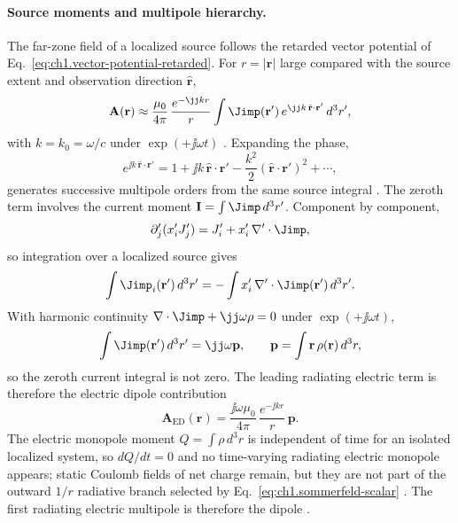 \paragraph{Source moments and multipole hierarchy.}
\label{sec:ch01.6.4}

The far-zone field of a localized source follows the retarded vector potential of Eq.~\eqref{eq:ch1.vector-potential-retarded}. For $r=|\mathbf{r}|$ large compared with the source extent and observation direction $\hat{\mathbf{r}}$,
\begin{equation}
\label{eq:ch1.far-zone-vector-potential}
\mathbf{A}(\mathbf{r})
\approx
\frac{\mu_0}{4\pi}\,
\frac{e^{-\jj kr}}{r}
\int \Jimp(\mathbf{r}')\,
e^{\jj k\,\hat{\mathbf{r}}\cdot\mathbf{r}'}\,
d^3r',
\end{equation}
with $k=k_0=\omega/c$ under $\exp(+\jj\omega t)$ \cite{jackson1999,stratton1941}. Expanding the phase,
\begin{equation}
\label{eq:ch1.source-phase-expansion}
e^{\jj k\,\hat{\mathbf{r}}\cdot\mathbf{r}'}
=
1+\jj k\,\hat{\mathbf{r}}\cdot\mathbf{r}'
-\frac{k^2}{2}(\hat{\mathbf{r}}\cdot\mathbf{r}')^{2}+\cdots,
\end{equation}
generates successive multipole orders from the same source integral \cite{stratton1941,jackson1999}. The zeroth term involves the current moment $\mathbf{I}=\int\Jimp\,d^3r'$. Component by component,
\begin{equation}
\label{eq:ch1.current-moment-identity}
\partial_j'(x_i' J_j')
=J_i'+x_i'\,\nabla'\cdot\Jimp,
\end{equation}
so integration over a localized source gives
\begin{equation}
\label{eq:ch1.total-current-moment}
\int\Jimp_i(\mathbf{r}')\,d^3r'
=-\int x_i'\,\nabla'\cdot\Jimp(\mathbf{r}')\,d^3r'.
\end{equation}
With harmonic continuity $\nabla\cdot\Jimp+\jj\omega\rho=0$ under $\exp(+\jj\omega t)$,
\begin{equation}
\label{eq:ch1.current-dipole-relation}
\int\Jimp(\mathbf{r}')\,d^3r'=\jj\omega\mathbf{p},
\qquad
\mathbf{p}=\int \mathbf{r}\,\rho(\mathbf{r})\,d^3r,
\end{equation}
so the zeroth current integral is not zero. The leading radiating electric term is therefore the electric dipole contribution
\begin{equation}
\label{eq:ch1.electric-dipole-potential}
\mathbf{A}_{\mathrm{ED}}(\mathbf{r})
=
\frac{\jj\omega\mu_0}{4\pi}\,
\frac{e^{-\jj kr}}{r}\,\mathbf{p}.
\end{equation}
The electric monopole moment $Q=\int\rho\,d^3r$ is independent of time for an isolated localized system, so $dQ/dt=0$ and no time-varying radiating electric monopole appears; static Coulomb fields of net charge remain, but they are not part of the outward $1/r$ radiative branch selected by Eq.~\eqref{eq:ch1.sommerfeld-scalar} \cite{maxwell1873,stratton1941}. The first radiating electric multipole is therefore the dipole \cite{jackson1999,stratton1941}.

